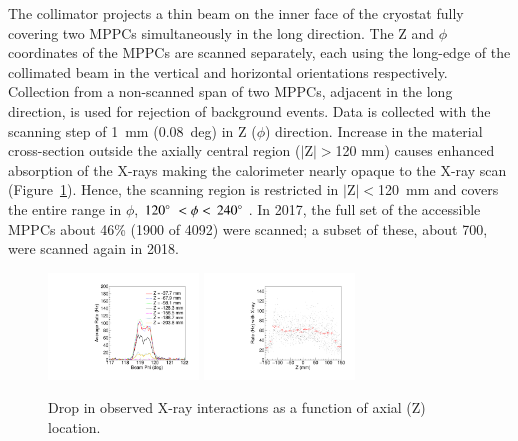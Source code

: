 The collimator projects a thin beam on the inner face of the cryostat
fully covering two MPPCs simultaneously in the long direction.  The Z
and $\phi$ coordinates of the MPPCs are scanned separately, each using
the long-edge of the collimated beam in the vertical and horizontal
orientations respectively.
Collection from a non-scanned span of two MPPCs, adjacent in the long direction, is used for rejection of background events.
Data is collected with the scanning step of
1~mm (0.08~deg) in Z ($\phi$) direction.  Increase in the material
cross-section outside the axially central region ($|$Z$|>$120 mm)
causes enhanced absorption of the X-rays making the calorimeter nearly
opaque to the X-ray scan (Figure~\ref{fig:ratevsz}).  Hence, the scanning
region is restricted in $|$Z$|<$120~mm and covers the entire range in
$\phi$, $120\mathrm{^{\circ}\hspace{1mm}}<\phi<\,240\mathrm{^{\circ}\hspace{1mm}}$.  In 2017, the full set of the
accessible MPPCs about 46\% (1900 of 4092) were scanned; a subset of
these, about 700, were scanned again in 2018.

\begin{figure}[] 
\includegraphics[width=4cm]{plots/xray_vs_Z}
\includegraphics[width=4cm]{plots/csig_z_phiscan} \caption{Drop in
observed X-ray interactions as a function of axial (Z)  location.}
\label{fig:ratevsz} 
\end{figure}  




